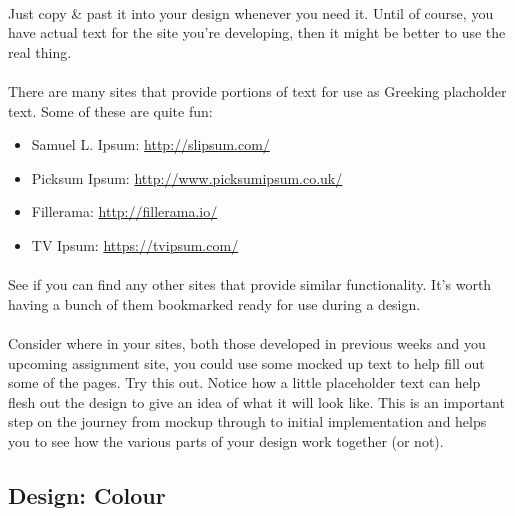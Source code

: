 \documentclass[10pt, a4paper]{article}
\begin{document}
\paragraph{} Just copy \& past it into your design whenever you need it. Until of course, you have actual text for the site you're developing, then it might be better to use the real thing.

\paragraph{} There are many sites that provide portions of text for use as Greeking placholder text. Some of these are quite fun:

\begin{itemize}
\item Samuel L. Ipsum: \url{http://slipsum.com/}
\item Picksum Ipsum: \url{http://www.picksumipsum.co.uk/}
\item Fillerama: \url{http://fillerama.io/}
\item TV Ipsum: \url{https://tvipsum.com/}
\end{itemize}

\paragraph{} See if you can find any other sites that provide similar functionality. It's worth having a bunch of them bookmarked ready for use during a design.

\paragraph{} Consider where in your sites, both those developed in previous weeks and you upcoming assignment site, you could use some mocked up text to help fill out some of the pages. Try this out. Notice how a little placeholder text can help flesh out the design to give an idea of what it will look like. This is an important step on the journey from mockup through to initial implementation and helps you to see how the various parts of your design work together (or not).

\subsection{Design: Colour}
\end{document}
